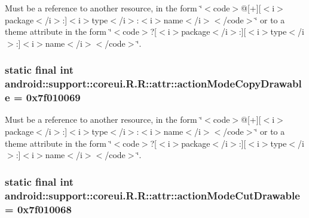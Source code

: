 Must be a reference to another resource, in the form \char`\"{}$<$code$>$@\mbox{[}+\mbox{]}\mbox{[}$<$i$>$package$<$/i$>$:\mbox{]}$<$i$>$type$<$/i$>$:$<$i$>$name$<$/i$>$$<$/code$>$\char`\"{} or to a theme attribute in the form \char`\"{}$<$code$>$?\mbox{[}$<$i$>$package$<$/i$>$:\mbox{]}\mbox{[}$<$i$>$type$<$/i$>$:\mbox{]}$<$i$>$name$<$/i$>$$<$/code$>$\char`\"{}. \hypertarget{classandroid_1_1support_1_1coreui_1_1_r_1_1attr_f2a5713a0346e7b7030ebfe6b8e1d9dd}{
\subsubsection[{actionModeCopyDrawable}]{\setlength{\rightskip}{0pt plus 5cm}static final int android::support::coreui.R.R::attr::actionModeCopyDrawable = 0x7f010069}}
\label{classandroid_1_1support_1_1coreui_1_1_r_1_1attr_f2a5713a0346e7b7030ebfe6b8e1d9dd}


Must be a reference to another resource, in the form \char`\"{}$<$code$>$@\mbox{[}+\mbox{]}\mbox{[}$<$i$>$package$<$/i$>$:\mbox{]}$<$i$>$type$<$/i$>$:$<$i$>$name$<$/i$>$$<$/code$>$\char`\"{} or to a theme attribute in the form \char`\"{}$<$code$>$?\mbox{[}$<$i$>$package$<$/i$>$:\mbox{]}\mbox{[}$<$i$>$type$<$/i$>$:\mbox{]}$<$i$>$name$<$/i$>$$<$/code$>$\char`\"{}. \hypertarget{classandroid_1_1support_1_1coreui_1_1_r_1_1attr_99cc17860139f2ef592073847c003f11}{
\subsubsection[{actionModeCutDrawable}]{\setlength{\rightskip}{0pt plus 5cm}static final int android::support::coreui.R.R::attr::actionModeCutDrawable = 0x7f010068}}
\label{classandroid_1_1support_1_1coreui_1_1_r_1_1attr_99cc17860139f2ef592073847c003f11}


